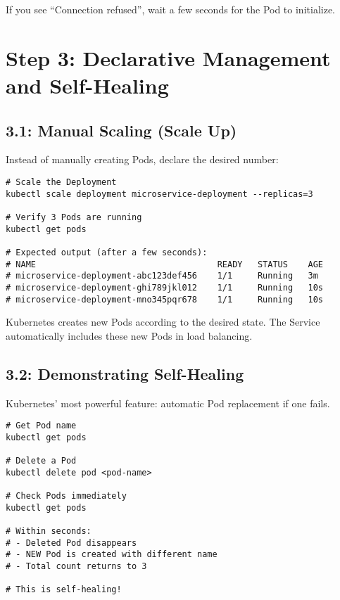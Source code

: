 \documentclass[12pt,a4paper]{article}
\begin{document}
\begin{tipbox}
If you see ``Connection refused'', wait a few seconds for the Pod to initialize.
\end{tipbox}

\newpage

\section{Step 3: Declarative Management and Self-Healing}

\subsection{3.1: Manual Scaling (Scale Up)}

Instead of manually creating Pods, declare the desired number:

\begin{lstlisting}[caption=Scale to 3 replicas]
# Scale the Deployment
kubectl scale deployment microservice-deployment --replicas=3

# Verify 3 Pods are running
kubectl get pods

# Expected output (after a few seconds):
# NAME                                    READY   STATUS    AGE
# microservice-deployment-abc123def456    1/1     Running   3m
# microservice-deployment-ghi789jkl012    1/1     Running   10s
# microservice-deployment-mno345pqr678    1/1     Running   10s
\end{lstlisting}

\begin{importantbox}
Kubernetes creates new Pods according to the desired state. The Service automatically includes these new Pods in load balancing.
\end{importantbox}

\subsection{3.2: Demonstrating Self-Healing}

Kubernetes' most powerful feature: automatic Pod replacement if one fails.

\begin{lstlisting}[caption=Pod self-healing]
# Get Pod name
kubectl get pods

# Delete a Pod
kubectl delete pod <pod-name>

# Check Pods immediately
kubectl get pods

# Within seconds:
# - Deleted Pod disappears
# - NEW Pod is created with different name
# - Total count returns to 3

# This is self-healing!
\end{lstlisting}
\end{document}
